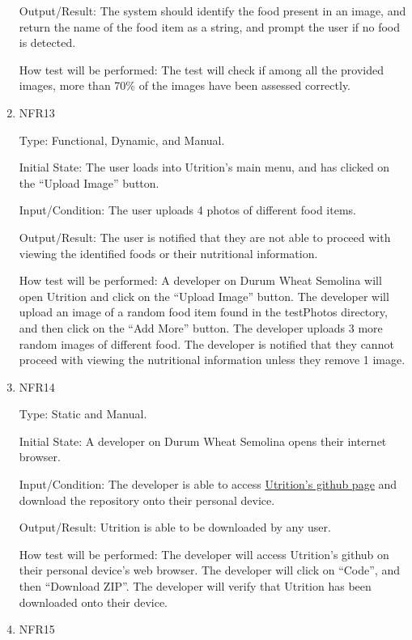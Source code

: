 \documentclass[12pt, titlepage]{article}
\begin{document}
\begin{enumerate}
		Output/Result: The system should identify the food present in an image, 
		and return the name of the food item as a string, and prompt the user 
		if no food is detected.
		
		How test will be performed: The test will check if among all the 
		provided images, more than 70\% of the images have been assessed 
		correctly.
		
		\item{NFR13\\} 
		
		Type: Functional, Dynamic, and Manual.
		
		Initial State: The user loads into Utrition’s main menu, and has clicked on the “Upload Image” button.
		
		Input/Condition: The user uploads 4 photos of different food items.
		
		Output/Result: The user is notified that they are not able to proceed with viewing the identified foods or their nutritional information.
		
		How test will be performed: A developer on Durum Wheat Semolina will open Utrition and click on the “Upload Image” button. The developer will upload an image of a random food item found in the testPhotos directory, and then click on the “Add More” button. The developer uploads 3 more random images of different food. The developer is notified that they cannot proceed with viewing the nutritional information unless they remove 1 image.
		
		\item{NFR14\\} 
		
		Type: Static and Manual.
		
		Initial State: A developer on Durum Wheat Semolina opens their internet browser.
		
		Input/Condition: The developer is able to access \href{https://github.com/jeff-rey-wang/utrition}{Utrition’s github page} and download the repository onto their personal device.
		
		Output/Result: Utrition is able to be downloaded by any user.
		
		How test will be performed: The developer will access Utrition’s github on their personal device’s web browser. The developer will click on “Code”, and then “Download ZIP”. The developer will verify that Utrition has been downloaded onto their device.
		
		\item{NFR15\\} 
		

\end{enumerate}
\end{document}
